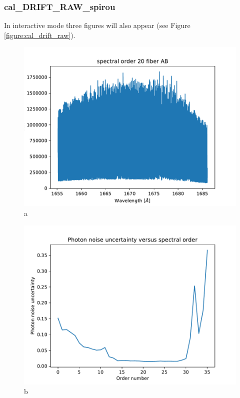 \newpage
\subsubsection{cal\_DRIFT\_RAW\_spirou}

\noindent In interactive mode three figures will also appear (see Figure \ref{figure:cal_drift_raw}).

\begin{figure}

\begin{center}
\begin{minipage}{.495\textwidth}
\begin{center}
\includegraphics[width=\textwidth]{Figures/cal_drift_raw_1.pdf}
a
\end{center}
\end{minipage}%
\begin{minipage}{.495\textwidth}
\begin{center}
\includegraphics[width=\textwidth]{Figures/cal_drift_raw_2.pdf}
b
\end{center}
\end{minipage}%
\end{center}


\end{figure}
